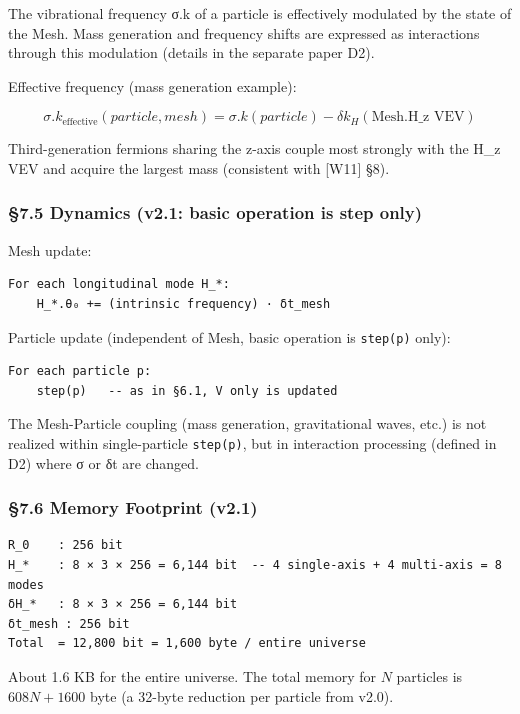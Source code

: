 \documentclass[a4paper,11pt]{article}
\begin{document}
The vibrational frequency σ.k of a particle is effectively modulated by
the state of the Mesh. Mass generation and frequency shifts are
expressed as interactions through this modulation (details in the
separate paper D2).

Effective frequency (mass generation example):

\[\sigma.k_{\text{effective}}(particle, mesh) = \sigma.k(particle) - \delta k_H(\text{Mesh.H\_z VEV})\]

Third-generation fermions sharing the z-axis couple most strongly with
the H\_z VEV and acquire the largest mass (consistent with {[}W11{]}
§8).

\subsubsection{§7.5 Dynamics (v2.1: basic operation is step
only)}\label{dynamics-v2.1-basic-operation-is-step-only}

Mesh update:

\begin{verbatim}
For each longitudinal mode H_*:
    H_*.θ₀ += (intrinsic frequency) · δt_mesh
\end{verbatim}

Particle update (independent of Mesh, basic operation is
\texttt{step(p)} only):

\begin{verbatim}
For each particle p:
    step(p)   -- as in §6.1, V only is updated
\end{verbatim}

The Mesh-Particle coupling (mass generation, gravitational waves, etc.)
is not realized within single-particle \texttt{step(p)}, but in
interaction processing (defined in D2) where σ or δt are changed.

\subsubsection{§7.6 Memory Footprint
(v2.1)}\label{memory-footprint-v2.1-1}

\begin{verbatim}
R_0    : 256 bit
H_*    : 8 × 3 × 256 = 6,144 bit  -- 4 single-axis + 4 multi-axis = 8 modes
δH_*   : 8 × 3 × 256 = 6,144 bit
δt_mesh : 256 bit
Total  = 12,800 bit = 1,600 byte / entire universe
\end{verbatim}

About 1.6 KB for the entire universe. The total memory for \(N\)
particles is \(608N + 1600\) byte (a 32-byte reduction per particle from
v2.0).
\end{document}
